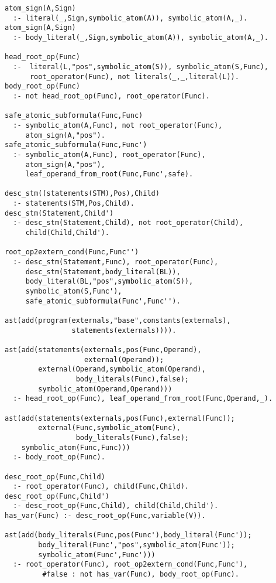\begin{center}
\begin{minipage}{\linewidth}
  \begin{lstlisting}[]
atom_sign(A,Sign)
  :- literal(_,Sign,symbolic_atom(A)), symbolic_atom(A,_).
atom_sign(A,Sign)
  :- body_literal(_,Sign,symbolic_atom(A)), symbolic_atom(A,_).

head_root_op(Func)
  :-  literal(L,"pos",symbolic_atom(S)), symbolic_atom(S,Func),
      root_operator(Func), not literals(_,_,literal(L)).
body_root_op(Func) 
  :- not head_root_op(Func), root_operator(Func).

safe_atomic_subformula(Func,Func) 
  :- symbolic_atom(A,Func), not root_operator(Func), 
     atom_sign(A,"pos").
safe_atomic_subformula(Func,Func')
  :- symbolic_atom(A,Func), root_operator(Func), 
     atom_sign(A,"pos"), 
     leaf_operand_from_root(Func,Func',safe).

desc_stm((statements(STM),Pos),Child) 
  :- statements(STM,Pos,Child).
desc_stm(Statement,Child') 
  :- desc_stm(Statement,Child), not root_operator(Child), 
     child(Child,Child').

root_op2extern_cond(Func,Func'')
  :- desc_stm(Statement,Func), root_operator(Func), 
     desc_stm(Statement,body_literal(BL)), 
     body_literal(BL,"pos",symbolic_atom(S)), 
     symbolic_atom(S,Func'), 
     safe_atomic_subformula(Func',Func'').

ast(add(program(externals,"base",constants(externals),
                statements(externals)))).

ast(add(statements(externals,pos(Func,Operand),
                   external(Operand));
        external(Operand,symbolic_atom(Operand),
                 body_literals(Func),false);
        symbolic_atom(Operand,Operand)))
  :- head_root_op(Func), leaf_operand_from_root(Func,Operand,_).

ast(add(statements(externals,pos(Func),external(Func));
        external(Func,symbolic_atom(Func),
                 body_literals(Func),false);
	symbolic_atom(Func,Func)))
  :- body_root_op(Func).

desc_root_op(Func,Child) 
  :- root_operator(Func), child(Func,Child).
desc_root_op(Func,Child')
  :- desc_root_op(Func,Child), child(Child,Child').
has_var(Func) :- desc_root_op(Func,variable(V)).

ast(add(body_literals(Func,pos(Func'),body_literal(Func'));
        body_literal(Func',"pos",symbolic_atom(Func'));
        symbolic_atom(Func',Func')))
  :- root_operator(Func), root_op2extern_cond(Func,Func'), 
		 #false : not has_var(Func), body_root_op(Func).
\end{lstlisting}
\end{minipage}
\end{center}
